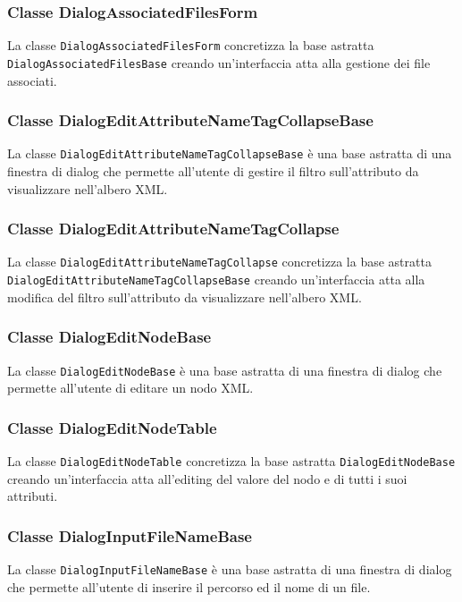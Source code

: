 	\subsubsection{Classe DialogAssociatedFilesForm}
		La classe \texttt{DialogAssociatedFilesForm} concretizza la base astratta \texttt{DialogAssociatedFilesBase} creando un'interfaccia atta alla gestione dei file associati.
		
	\subsubsection{Classe DialogEditAttributeNameTagCollapseBase}
		La classe \texttt{DialogEditAttributeNameTagCollapseBase} è una base astratta di una finestra di dialog che permette all'utente di gestire il filtro sull'attributo da visualizzare nell'albero XML.
	
	\subsubsection{Classe DialogEditAttributeNameTagCollapse}
		La classe \texttt{DialogEditAttributeNameTagCollapse} concretizza la base astratta \texttt{DialogEditAttributeNameTagCollapseBase} creando un'interfaccia atta alla modifica del filtro sull'attributo da visualizzare nell'albero XML.

	\subsubsection{Classe DialogEditNodeBase}
		La classe \texttt{DialogEditNodeBase} è una base astratta di una finestra di dialog che permette all'utente di editare un nodo XML.
		
	\subsubsection{Classe DialogEditNodeTable}
		La classe \texttt{DialogEditNodeTable} concretizza la base astratta \texttt{DialogEditNodeBase} creando un'interfaccia atta all'editing del valore del nodo e di tutti i suoi attributi.

	\subsubsection{Classe DialogInputFileNameBase}
		La classe \texttt{DialogInputFileNameBase} è una base astratta di una finestra di dialog che permette all'utente di inserire il percorso ed il nome di un file.
	
